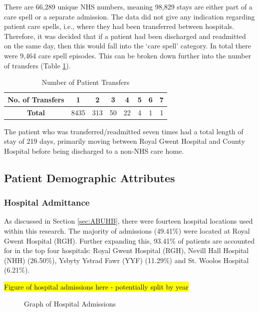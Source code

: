 \documentclass[../thesis.tex]{subfiles}
\begin{document}
There are 66,289 unique NHS numbers, meaning 98,829 stays are either part of a care spell or a separate admission. The data did not give any indication regarding patient care spells, i.e., where they had been transferred between hospitals. Therefore, it was decided that if a patient had been discharged and readmitted on the same day, then this would fall into the `care spell’ category. In total there were 9,464 care spell episodes. This can be broken down further into the number of transfers (Table \ref{Tab:Spell}).
\begin{table}[H]
    \centering
    \begin{tabular}{cccccccc}\toprule
    \textbf{No. of Transfers} & \textbf{1} & \textbf{2} & \textbf{3} & \textbf{4} & \textbf{5} & \textbf{6} & \textbf{7}   \\ \midrule
\textbf{Total} & 8435 & 313 & 50 & 22 & 4 & 1& 1\\ \bottomrule
    \end{tabular}
    \caption{Number of Patient Transfers}
    \label{Tab:Spell}
\end{table}
The patient who was transferred/readmitted seven times had a total length of stay of 219 days, primarily moving between Royal Gwent Hospital and County Hospital before being discharged to a non-NHS care home.

\subsection{Patient Demographic Attributes}
\subsubsection{Hospital Admittance}
As discussed in Section \ref{sec:ABUHB}, there were fourteen hospital locations used within this research.
The majority of admissions (49.41\%) were located at Royal Gwent Hospital (RGH). Further expanding this, 93.41\% of patients are accounted for in the top four hospitals: Royal Gwent Hospital (RGH), Nevill Hall Hospital (NHH) (26.50\%), Ysbyty Ystrad Fawr (YYF) (11.29\%) and St. Woolos Hospital (6.21\%).

\hl{Figure of hospital admissions here - potentially split by year}
\begin{figure}[H]
    \centering
    \caption{Graph of Hospital Admissions} %
    \label{Fig:Hospital}
\end{figure}
\end{document}

